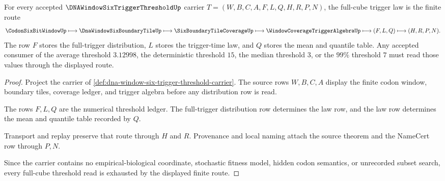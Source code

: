 \begin{theorem}
\label{thm:dna-window-six-trigger-threshold-full-cube-law}
For every accepted $\DNAWindowSixTriggerThresholdUp$ carrier
$T=(W,B,C,A,F,L,Q,H,R,P,N)$, the full-cube trigger law is the finite route
$$
\CodonSixBitWindowUp
\longmapsto
\DnaWindowSixBoundaryTileUp
\longmapsto
\SixBoundaryTileCoverageUp
\longmapsto
\WindowCoverageTriggerAlgebraUp
\longmapsto
(F,L,Q)
\longmapsto
(H,R,P,N).
$$
The row $F$ stores the full-trigger distribution, $L$ stores the trigger-time
law, and $Q$ stores the mean and quantile table. Any accepted consumer of the
average threshold $3.12998$, the deterministic threshold $15$, the median
threshold $3$, or the $99\%$ threshold $7$ must read those values through the
displayed route.
\end{theorem}
\begin{proof}
Project the carrier of
\autoref{def:dna-window-six-trigger-threshold-carrier}. The source rows
$W,B,C,A$ display the finite codon window, boundary tiles, coverage ledger,
and trigger algebra before any distribution row is read.

The rows $F,L,Q$ are the numerical threshold ledger. The full-trigger
distribution row determines the law row, and the law row determines the mean
and quantile table recorded by $Q$.

Transport and replay preserve that route through $H$ and $R$. Provenance and
local naming attach the source theorem and the NameCert row through $P,N$.

Since the carrier contains no empirical-biological coordinate, stochastic
fitness model, hidden codon semantics, or unrecorded subset search, every
full-cube threshold read is exhausted by the displayed finite route.
\end{proof}



